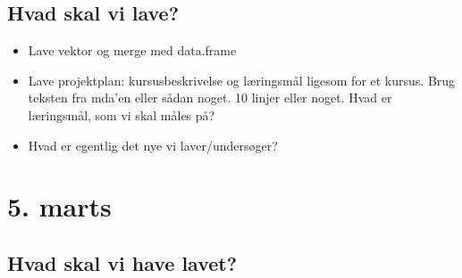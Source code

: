 \subsection{Hvad skal vi lave?}
\begin{itemize} 
    \item Lave vektor og merge med data.frame
    \item Lave projektplan: kursusbeskrivelse og læringsmål ligesom for et kursus. Brug teksten fra mda'en eller sådan noget. 10 linjer eller noget. Hvad er læringsmål, som vi skal måles på? 
    \item Hvad er egentlig det nye vi laver/undersøger?
\end{itemize}

\pagebreak

\section{5. marts}

\subsection{Hvad skal vi have lavet?}

